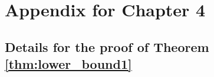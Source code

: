 \def\ind{\mathbbm{1}}
\def\oc{Online\_Cluster}
\def\ocns{No\_Sub\_Cluster}
\def\mem{\mathcal M}
\def\E{\mathbb{E}}
\def\R{\mathbb{R}}
\def\OC{\text{OC}}
\def\cH{\mathcal H}
\def\reals{\mathbb{R}}
\def\cD{\mathcal D}
\def\Ev{\mathbb{E}}
\def\cO{\mathcal O}
\def\cX{\mathcal X}
\def\cU{\mathcal U}
\def\cM{\mathcal M}



\chapter{Appendix for Chapter 4}

\section{Details for the proof of Theorem \ref{thm:lower_bound1}}\label{sec:lower_bound_proof}

